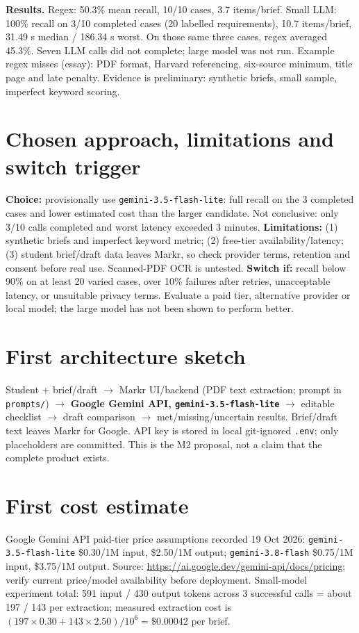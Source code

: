 \documentclass[8pt]{article}
\begin{document}
\textbf{Results.} Regex: 50.3\% mean recall, 10/10 cases, 3.7 items/brief. Small LLM: 100\% recall on 3/10 completed cases (20 labelled requirements), 10.7 items/brief, 31.49 s median / 186.34 s worst. On those same three cases, regex averaged 45.3\%. Seven LLM calls did not complete; large model was not run. Example regex misses (essay): PDF format, Harvard referencing, six-source minimum, title page and late penalty. Evidence is preliminary: synthetic briefs, small sample, imperfect keyword scoring.
\section{Chosen approach, limitations and switch trigger}
\textbf{Choice:} provisionally use \texttt{gemini-3.5-flash-lite}: full recall on the 3 completed cases and lower estimated cost than the larger candidate. Not conclusive: only 3/10 calls completed and worst latency exceeded 3 minutes. \textbf{Limitations:} (1) synthetic briefs and imperfect keyword metric; (2) free-tier availability/latency; (3) student brief/draft data leaves Markr, so check provider terms, retention and consent before real use. Scanned-PDF OCR is untested. \textbf{Switch if:} recall below 90\% on at least 20 varied cases, over 10\% failures after retries, unacceptable latency, or unsuitable privacy terms. Evaluate a paid tier, alternative provider or local model; the large model has not been shown to perform better.
\section{First architecture sketch}
Student + brief/draft $\rightarrow$ Markr UI/backend (PDF text extraction; prompt in \texttt{prompts/}) $\rightarrow$ \textbf{Google Gemini API, \texttt{gemini-3.5-flash-lite}} $\rightarrow$ editable checklist $\rightarrow$ draft comparison $\rightarrow$ met/missing/uncertain results. Brief/draft text leaves Markr for Google. API key is stored in local git-ignored \texttt{.env}; only placeholders are committed. This is the M2 proposal, not a claim that the complete product exists.
\section{First cost estimate}
Google Gemini API paid-tier price assumptions recorded 19 Oct 2026: \texttt{gemini-3.5-flash-lite} \$0.30/1M input, \$2.50/1M output; \texttt{gemini-3.8-flash} \$0.75/1M input, \$3.75/1M output. Source: \url{https://ai.google.dev/gemini-api/docs/pricing}; verify current price/model availability before deployment. Small-model experiment total: 591 input / 430 output tokens across 3 successful calls = about 197 / 143 per extraction; measured extraction cost is $(197\times0.30+143\times2.50)/10^6=\$0.00042$ per brief.
\end{document}
